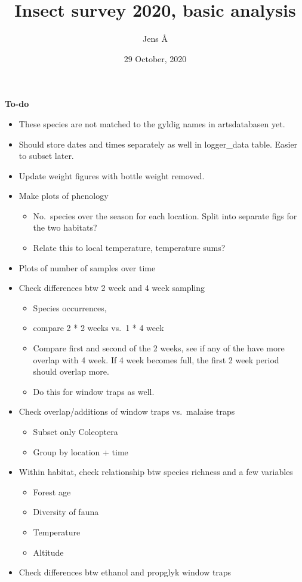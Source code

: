 \documentclass[]{article}
\title{Insect survey 2020, basic analysis}
\author{Jens Å}
\date{29 October, 2020}
\providecommand{\tightlist}{%
  \setlength{\itemsep}{0pt}\setlength{\parskip}{0pt}}
\begin{document}
\maketitle

{
\setcounter{tocdepth}{2}
\tableofcontents
}
\textbf{To-do}

\begin{itemize}
\item
  These species are not matched to the gyldig names in artsdatabasen
  yet.
\item
  Should store dates and times separately as well in logger\_data table.
  Easier to subset later.
\item
  Update weight figures with bottle weight removed.
\item
  Make plots of phenology

  \begin{itemize}
  \tightlist
  \item
    No.~species over the season for each location. Split into separate
    figs for the two habitats?
  \item
    Relate this to local temperature, temperature sums?
  \end{itemize}
\item
  Plots of number of samples over time
\item
  Check differences btw 2 week and 4 week sampling

  \begin{itemize}
  \tightlist
  \item
    Species occurrences,
  \item
    compare 2 * 2 weeks vs.~1 * 4 week
  \item
    Compare first and second of the 2 weeks, see if any of the have more
    overlap with 4 week. If 4 week becomes full, the first 2 week period
    should overlap more.
  \item
    Do this for window traps as well.
  \end{itemize}
\item
  Check overlap/additions of window traps vs.~malaise traps

  \begin{itemize}
  \tightlist
  \item
    Subset only Coleoptera
  \item
    Group by location + time
  \end{itemize}
\item
  Within habitat, check relationship btw species richness and a few
  variables

  \begin{itemize}
  \tightlist
  \item
    Forest age
  \item
    Diversity of fauna
  \item
    Temperature
  \item
    Altitude
  \end{itemize}
\item
  Check differences btw ethanol and propglyk window traps
\end{itemize}
\end{document}
